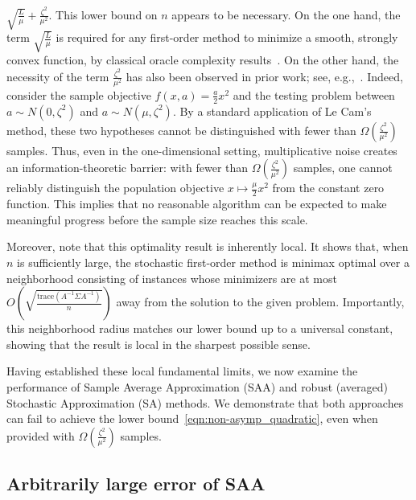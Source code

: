 \documentclass[11pt,twoside]{article}
\numberwithin{equation}{section}
\newcommand{\trace}[1]{\mathrm{trace}\left(#1\right)}
\newcommand{\1}{\mathbf{1}}
\theoremstyle{remark}
\theoremstyle{plain}
\begin{document}
$\sqrt{\frac{L}{\mu}} + \frac{\zeta^2}{\mu^2}.$
This lower bound on \(n\) appears to be necessary. On the one hand, the term \(\sqrt{\frac{L}{\mu}}\) is required for any first-order method to minimize a smooth, strongly convex function, by classical oracle complexity results~\cite{complexity}. On the other hand, the necessity of the term $\frac{\zeta^2}{\mu^2}$ has also been observed in prior work; see, e.g.,~\cite{khamaru2021temporal, li2022root,li2023accelerated,mou2023optimal}. Indeed, consider the sample objective \(f(x,a)=\frac{a}{2}x^2\) and the testing problem between \(a\sim N(0,\zeta^2)\) and \(a\sim N(\mu,\zeta^2)\). By a standard application of Le Cam's method, these two hypotheses cannot be distinguished with fewer than $\Omega(\frac{\zeta^2}{\mu^2})$ samples. Thus, even in the one-dimensional setting, multiplicative noise creates an information-theoretic barrier: with fewer than \(\Omega(\frac{\zeta^2}{\mu^2})\) samples, one cannot reliably distinguish the population objective \(x\mapsto \frac{\mu}{2}x^2\) from the constant zero function. This implies that no reasonable algorithm can be expected to make meaningful progress before the sample size reaches this scale.

Moreover, note that this optimality result is inherently local. It shows that, when $n$ is sufficiently large, the stochastic first-order method is minimax optimal over a neighborhood consisting of instances whose minimizers are at most $O\left(\sqrt{\frac{\trace{A^{-1}\Sigma A^{-1}}} {n}}\right)$ away from the solution to the given problem. Importantly, this neighborhood radius matches our lower bound up to a universal constant, showing that the result is local in the sharpest possible sense.





Having established these local fundamental limits, we now examine the performance of Sample Average Approximation (SAA) and robust (averaged) Stochastic Approximation (SA) methods. We demonstrate that both approaches can fail to achieve the lower bound~\eqref{eqn:non-asymp_quadratic}, even when provided with $\Omega\left(\frac{\zeta^2}{\mu^2}\right)$ samples.
\subsection{Arbitrarily large  error of SAA}\label{sec:SAA_fail}
\end{document}
